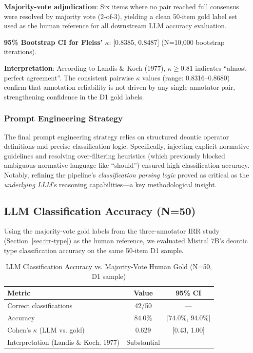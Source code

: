 \textbf{Majority-vote adjudication}: Six items where no pair reached full consensus were resolved by majority vote (2-of-3), yielding a clean 50-item gold label set used as the human reference for all downstream LLM accuracy evaluation.

\textbf{95\% Bootstrap CI for Fleiss' $\kappa$}: [0.8385, 0.8487] (N=10,000 bootstrap iterations).

\textbf{Interpretation}: According to Landis \& Koch (1977), $\kappa \geq 0.81$ indicates ``almost perfect agreement''. The consistent pairwise $\kappa$ values (range: 0.8316--0.8680) confirm that annotation reliability is not driven by any single annotator pair, strengthening confidence in the D1 gold labels.

\subsubsection{Prompt Engineering Strategy}

The final prompt engineering strategy relies on structured deontic operator definitions and precise classification logic. Specifically, injecting explicit normative guidelines and resolving over-filtering heuristics (which previously blocked ambiguous normative language like ``should'') ensured high classification accuracy. Notably, refining the pipeline's \textit{classification parsing logic} proved as critical as the \textit{underlying LLM}'s reasoning capabilities---a key methodological insight.

\subsection{LLM Classification Accuracy (N=50)}
\label{sec:intra-annotator}

Using the majority-vote gold labels from the three-annotator IRR study (Section~\ref{sec:irr-type}) as the human reference, we evaluated Mistral 7B's deontic type classification accuracy on the same 50-item D1 sample.

\begin{table}[htbp]
\centering
\caption{LLM Classification Accuracy vs. Majority-Vote Human Gold (N=50, D1 sample)}
\label{tab:llm-accuracy-d3}
\begin{tabular}{lcc}
\toprule
\textbf{Metric} & \textbf{Value} & \textbf{95\% CI} \\
\midrule
Correct classifications & 42/50 & --- \\
Accuracy & 84.0\% & [74.0\%, 94.0\%] \\
Cohen's $\kappa$ (LLM vs. gold) & 0.629 & [0.43, 1.00] \\
Interpretation (Landis \& Koch, 1977) & Substantial & --- \\
\bottomrule
\end{tabular}
\end{table}

